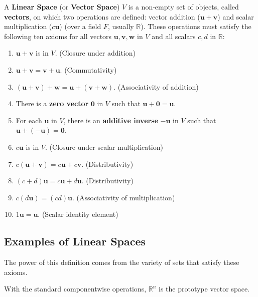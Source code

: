 \begin{definition}
A \textbf{Linear Space} (or \textbf{Vector Space}) $V$ is a non-empty set of objects, called \textbf{vectors}, on which two operations are defined: vector addition ($\mathbf{u} + \mathbf{v}$) and scalar multiplication ($c\mathbf{u}$) (over a field $F$, usually $\mathbb{R}$). These operations must satisfy the following ten axioms for all vectors $\mathbf{u}, \mathbf{v}, \mathbf{w}$ in $V$ and all scalars $c, d$ in $\mathbb{R}$:

\begin{enumerate}
    \item $\mathbf{u} + \mathbf{v}$ is in $V$. (Closure under addition)
    \item $\mathbf{u} + \mathbf{v} = \mathbf{v} + \mathbf{u}$. (Commutativity)
    \item $(\mathbf{u} + \mathbf{v}) + \mathbf{w} = \mathbf{u} + (\mathbf{v} + \mathbf{w})$. (Associativity of addition)
    \item There is a \textbf{zero vector} $\mathbf{0}$ in $V$ such that $\mathbf{u} + \mathbf{0} = \mathbf{u}$.
    \item For each $\mathbf{u}$ in $V$, there is an \textbf{additive inverse} $-\mathbf{u}$ in $V$ such that $\mathbf{u} + (-\mathbf{u}) = \mathbf{0}$.
    \item $c\mathbf{u}$ is in $V$. (Closure under scalar multiplication)
    \item $c(\mathbf{u} + \mathbf{v}) = c\mathbf{u} + c\mathbf{v}$. (Distributivity)
    \item $(c+d)\mathbf{u} = c\mathbf{u} + d\mathbf{u}$. (Distributivity)
    \item $c(d\mathbf{u}) = (cd)\mathbf{u}$. (Associativity of multiplication)
    \item $1\mathbf{u} = \mathbf{u}$. (Scalar identity element)
\end{enumerate}
\end{definition}

\subsection{Examples of Linear Spaces}
The power of this definition comes from the variety of sets that satisfy these axioms.
\begin{example}
With the standard componentwise operations, $\mathbb{R}^n$ is the prototype vector space.
\end{example}

